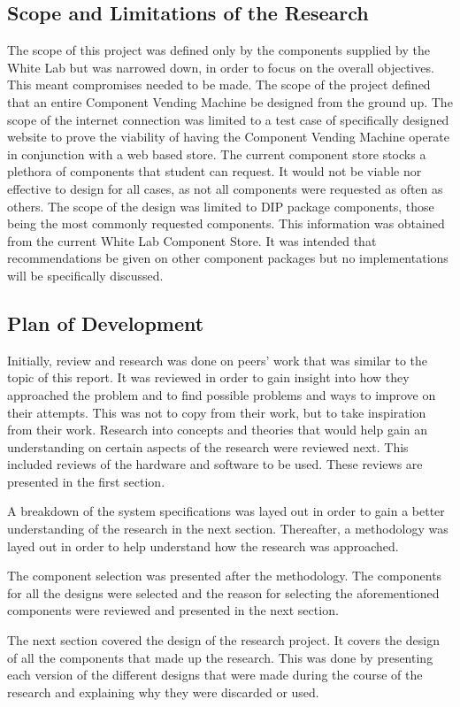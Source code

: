 \documentclass[a4paper,11pt]{article}
\numberwithin{figure}{section}
\numberwithin{table}{section}
\begin{document}
	\subsection{Scope and Limitations of the Research}
The scope of this project was defined only by the components supplied by the White Lab but was narrowed down, in order to focus on the overall objectives. This meant compromises needed to be made. The scope of the project defined that an entire Component Vending Machine be designed from the ground up. The scope of the internet connection was limited to a test case of specifically designed website to prove the viability of having the Component Vending Machine operate in conjunction with a web based store. The current component store stocks a plethora of components that student can request. It would not be viable nor effective to design for all cases, as not all components were requested as often as others. The scope of the design was limited to DIP package components, those being the most commonly requested components. This information was obtained from the current White Lab Component Store. It was intended that recommendations be given on other component packages but no implementations will be specifically discussed. 
	\subsection{Plan of Development}	
Initially, review and research was done on peers' work that was similar to the topic of this report. It was reviewed in order to gain insight into how they approached the problem and to find possible problems and ways to improve on their attempts. This was not to copy from their work, but to take inspiration from their work. Research into concepts and theories that would help gain an understanding on certain aspects of the research were reviewed next. This included reviews of the hardware and software to be used. These reviews are presented in the first section.

A breakdown of the system specifications was layed out in order to gain a better understanding of the research in the next section. Thereafter, a methodology was layed out in order to help understand how the research was approached. 

The component selection was presented after the methodology. The components for all the designs were selected and the reason for selecting the aforementioned components were reviewed and presented in the next section.

The next section covered the design of the research project. It covers the design of all the components that made up the research. This was done by presenting each version of the different designs that were made during the course of the research and explaining why they were discarded or used.
\end{document}

